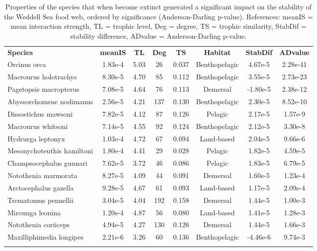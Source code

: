 \documentclass[gc, manuscript]{copernicus}
\begin{document}
\begin{table}[t]
\caption{Properties of the species that when become extinct generated a significant impact on the stability of the Weddell Sea food web, ordered by significance (Anderson-Darling p-value). References: meanIS = mean interaction strength, TL = trophic level, Deg = degree, TS = trophic similarity, StabDif = stability difference, ADvalue = Anderson-Darling p-value.}
\begin{tabular}{l c c c c c c c}
\tophline

\textbf{Species} & \textbf{meanIS} & \textbf{TL} & \textbf{Deg} & \textbf{TS} & \textbf{Habitat} & \textbf{StabDif} & \textbf{ADvalue}\\
\middlehline
Orcinus orca & 1.83e-4 & 5.03 & 26 & 0.037 & Benthopelagic & 4.67e-5 & 2.28e-41 \\
\middlehline
Macrourus holotrachys & 8.30e-5 & 4.70 & 85 & 0.112 & Benthopelagic & 3.55e-5 & 2.73e-23 \\
\middlehline
Pagetopsis macropterus & 7.08e-5 & 4.64 & 76 & 0.113 & Demersal & -1.80e-5 & 2.38e-12 \\
\middlehline
Abyssorchomene nodimanus & 2.56e-5 & 4.21 & 137 & 0.130 & Benthopelagic & 2.30e-5 & 8.52e-10 \\
\middlehline
Dissostichus mawsoni & 7.82e-5 & 4.12 & 87 & 0.126 & Pelagic & 2.17e-5 & 1.57e-9 \\
\middlehline
Macrourus whitsoni & 7.14e-5 & 4.55 & 92 & 0.124 & Benthopelagic & 2.12e-5 & 3.30e-8 \\
\middlehline
Hydrurga leptonyx & 1.03e-4 & 4.72 & 67 & 0.094 & Land-based & 2.04e-5 & 9.66e-6 \\
\middlehline
Mesonychoteuthis hamiltoni & 1.80e-4 & 4.41 & 29 & 0.028 & Pelagic & 1.82e-5 & 4.59e-5 \\
\middlehline
Champsocephalus gunnari & 7.62e-5 & 3.72 & 46 & 0.086 & Pelagic & 1.83e-5 & 6.79e-5 \\
\middlehline
Notothenia marmorata & 8.27e-5 & 4.09 & 44 & 0.091 & Demersal & 1.60e-5 & 1.23e-4 \\
\middlehline
Arctocephalus gazella & 9.28e-5 & 4.67 & 61 & 0.093 & Land-based & 1.17e-5 & 2.09e-4 \\
\middlehline
Trematomus pennellii & 3.04e-5 & 4.04 & 192 & 0.158 & Demersal & 1.44e-5 & 1.00e-3 \\
\middlehline
Mirounga leonina & 1.20e-4 & 4.87 & 56 & 0.080 & Land-based & 1.41e-5 & 1.28e-3 \\
\middlehline
Notothenia coriiceps & 4.94e-5 & 4.27 & 130 & 0.126 & Demersal & 1.44e-5 & 1.66e-3 \\
\middlehline
Maxilliphimedia longipes & 2.21e-6 & 3.26 & 60 & 0.136 & Benthopelagic & -4.46e-6 & 9.74e-3 \\

\bottomhline
\end{tabular}
\end{table}
\end{document}

